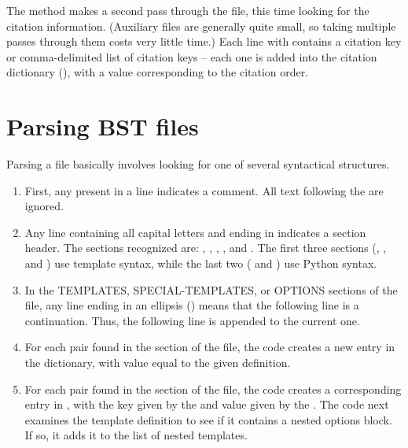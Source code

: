 \documentclass[letterpaper,10pt,english]{sphinxmanual}
\begin{document}
The  method makes a second pass through the  file, this time looking for the citation information. (Auxiliary files are generally quite small, so taking multiple passes through them costs very little time.) Each line with  contains a citation key or comma-delimited list of citation keys -- each one is added into the citation dictionary (), with a value corresponding to the citation order.


\section{Parsing BST files}
\label{developer_guide:parsing-bst-files}
Parsing a  file basically involves looking for one of several syntactical structures.
\begin{enumerate}
\item {} 
First, any \code{\#} present in a line indicates a comment. All text following the \code{\#} are ignored.

\item {} 
Any line containing all capital letters and ending in \code{:} indicates a section header. The sections recognized are: , , , , and . The first three sections (, , and ) use template syntax, while the last two (  and ) use Python syntax.

\item {} 
In the TEMPLATES, SPECIAL-TEMPLATES, or OPTIONS sections of the file, any line ending in an ellipsis () means that the following line is a continuation. Thus, the following line is appended to the current one.

\item {} 
For each  pair found in the  section of the file, the code creates a new entry in the  dictionary, with value equal to the given definition.

\item {} 
For each  pair found in the  section of the file, the code creates a corresponding entry in , with the key given by the  and value given by the . The code next examines the template definition to see if it contains a nested options block. If so, it adds it to the list of nested templates.


\end{enumerate}
\end{document}
